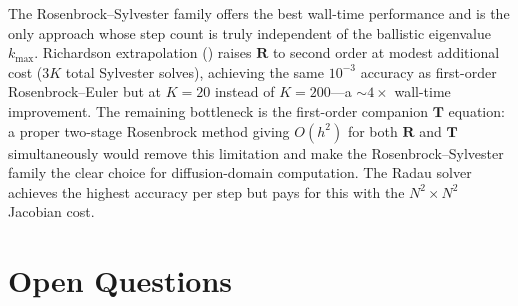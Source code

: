 \documentclass[11pt,a4paper]{article}
\newcommand{\mat}[1]{\mathbf{#1}}
\newcommand{\kmax}{k_{\max}}
\theoremstyle{definition}
\begin{document}
The Rosenbrock--Sylvester family offers the best wall-time performance
and is the only approach whose step count is truly independent of the
ballistic eigenvalue $\kmax$.  Richardson extrapolation
() raises $\mat{R}$ to second order at modest
additional cost ($3K$ total Sylvester solves), achieving the same
$10^{-3}$ accuracy as first-order Rosenbrock--Euler but at $K=20$
instead of $K=200$---a $\sim\!4\times$ wall-time improvement.  The
remaining bottleneck is the first-order companion $\mat{T}$ equation:
a proper two-stage Rosenbrock method giving $O(h^2)$ for both
$\mat{R}$ and $\mat{T}$ simultaneously would remove this limitation and
make the Rosenbrock--Sylvester family the clear choice for
diffusion-domain computation.
The Radau solver achieves the highest accuracy per step but pays for
this with the $N^2\!\times\!N^2$ Jacobian cost.


\section{Open Questions}\label{sec:open}
\end{document}
